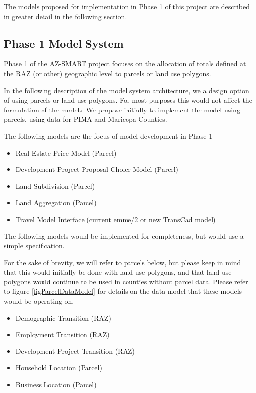 The models proposed for implementation in Phase 1 of this project are
described in greater detail in the following section.

\subsection{Phase 1 Model System}
Phase 1 of the AZ-SMART project focuses on the allocation of totals
defined at the RAZ (or other) geographic level to parcels or land use
polygons.  

In the following
description of the model system architecture, we a design
option of using parcels or land use polygons.  For most purposes this would not affect
the formulation of the models.  We propose initially to implement the model using 
parcels, using data for PIMA and Maricopa Counties.

The following models are the focus of model development in Phase 1:

\begin{itemize}
\item Real Estate Price Model (Parcel)
\item Development Project Proposal Choice Model (Parcel)
\item Land Subdivision (Parcel)
\item Land Aggregation (Parcel)
\item Travel Model Interface (current emme/2 or new TransCad model)
\end{itemize}

The following models would be implemented for completeness, but would
use a simple specification.

For the sake of brevity, we will refer to parcels below, but please keep in mind
that this would initially be done with land use polygons, and that land use 
polygons would continue to be used in counties without parcel data.  Please refer
to figure \ref{figParcelDataModel} for details on the data model that these models 
would be operating on.

\begin{itemize}
\item Demographic Transition (RAZ)
\item Employment Transition (RAZ)
\item Development Project Transition (RAZ)
\item Household Location (Parcel)
\item Business Location (Parcel)
\end{itemize}

